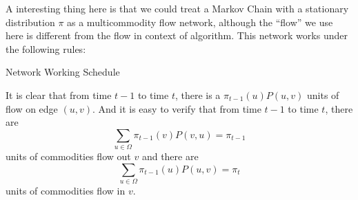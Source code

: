 A interesting thing here is that we could treat a Markov Chain with a stationary distribution $\pi$ as a multicommodity flow network, although the ``flow'' we use here is different from the flow in context of algorithm.
This network works under the following rules:
\begin{algorithm}
  Network Working Schedule \\
\end{algorithm}

It is clear that from time $t-1$ to time $t$, there is a $\pi_{t-1}(u)P(u,v)$ units of flow on edge $(u, v)$. And it is easy to verify that from time $t-1$ to time $t$, there are
\[\sum_{u\in\Omega}\pi_{t-1}(v)P(v, u) = \pi_{t-1}\]
units of commodities flow out $v$ and there are
\[\sum_{u\in\Omega}\pi_{t-1}(u)P(u, v) = \pi_{t}\]
units of commodities flow in $v$.

